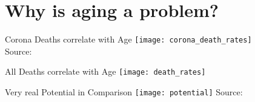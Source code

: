 \section{Why is aging a problem?}


\begin{frame}[c]{Corona Deaths correlate with Age}
    \texttt{[image: corona\_death\_rates]} \\
    Source: \cite{10.1111/acel.13230}
\end{frame}


\begin{frame}[c]{All Deaths correlate with Age}
    \texttt{[image: death\_rates]}
\end{frame}


\begin{frame}[c]{Very real Potential in Comparison}
    \texttt{[image: potential]}
    Source: \cite{10.1093/ppar/prz022}
\end{frame}


